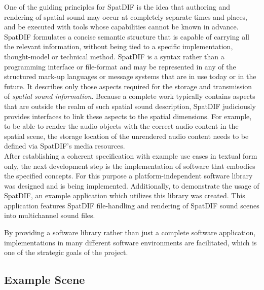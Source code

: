 \documentclass[a4paper]{article}
\begin{document}
One of the guiding principles for SpatDIF is the idea that authoring and rendering of spatial sound may occur at completely separate times and places, and be executed with tools whose capabilities cannot be known in advance. 
SpatDIF formulates a concise semantic structure that is capable of carrying all the relevant information, without being tied to a specific implementation, thought-model or technical method. 
SpatDIF is a syntax rather than a programming interface or file-format and may be represented in any of the structured mark-up languages or message systems that are in use today or in the future. 
It describes only those aspects required for the storage and transmission of \emph{spatial sound information}.
Because a complete work typically contains aspects that are outside the realm of such spatial sound description, SpatDIF judiciously provides interfaces to link these aspects to the spatial dimensions.
For example, to be able to render the audio objects with the correct audio content in the spatial scene, the storage location of the unrendered audio content needs to be defined via SpatDIF's media resources.
\\
After establishing a coherent specification with example use cases in textual form only, the next development step is the implementation of software that embodies the specified concepts.
For this purpose a platform-independent software library was designed and is being implemented. 
Additionally, to demonstrate the usage of SpatDIF, an example application which utilizes this library was created. This application features SpatDIF file-handling and  rendering of SpatDIF sound scenes into multichannel sound files.

By providing a software library rather than just a complete software application, implementations in many different software environments are facilitated, which is one of the strategic goals of the project.

\subsection{Example Scene}
 
\end{document}

